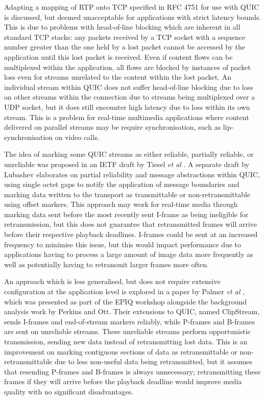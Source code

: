 \documentclass{mprop}
\begin{document}
Adapting a mapping of RTP onto TCP specified in RFC 4751 \cite{RTP-TCP-RFC} for use with QUIC is discussed, but deemed unacceptable for applications with strict latency bounds. This is due to problems with head-of-line blocking which are inherent in all standard TCP stacks: any packets received by a TCP socket with a sequence number greater than the one held by a lost packet cannot be accessed by the application until this lost packet is received. Even if content flows can be multiplexed within the application, all flows are blocked by instances of packet loss even for streams unrelated to the content within the lost packet. An individual stream within QUIC does not suffer head-of-line blocking due to loss on other streams within the connection due to streams being multiplexed over a UDP socket, but it does still encounter high latency due to loss within its own stream. This is a problem for real-time multimedia applications where content delivered on parallel streams may be require synchronisation, such as lip-synchronisation on video calls.

The idea of marking some QUIC streams as either reliable, partially reliable, or unreliable was proposed in an IETF draft by Tiesel \textit{et al} \cite{Tiesel2017}. A separate draft by Lubashev \cite{Lubashev2018} elaborates on partial reliability and message abstractions within QUIC, using single octet gaps to notify the application of message boundaries and marking data written to the transport as transmittable or non-retransmittable using offset markers. This approach may work for real-time media through marking data sent before the most recently sent I-frame as being ineligible for retransmission, but this does not guarantee that retransmitted frames will arrive before their respective playback deadlines. I-frames could be sent at an increased frequency to minimise this issue, but this would impact performance due to applications having to process a large amount of image data more frequently as well as potentially having to retransmit larger frames more often.

An approach which is less generalised, but does not require extensive configuration at the application level is explored in a paper by Palmer \textit{et al} \cite{Palmer2018}, which was presented as part of the EPIQ workshop alongside the background analysis work by Perkins and Ott. Their extensions to QUIC, named ClipStream, sends I-frames and end-of-stream markers reliably, while P-frames and B-frames are sent on unreliable streams. These unreliable streams perform opportunistic transmission, sending new data instead of retransmitting lost data. This is an improvement on marking contiguous sections of data as retransmittable or non-retransmittable due to less non-useful data being retransmitted, but it assumes that resending P-frames and B-frames is always unnecessary; retransmitting these frames if they will arrive before the playback deadline would improve media quality with no significant disadvantages.
\end{document}
